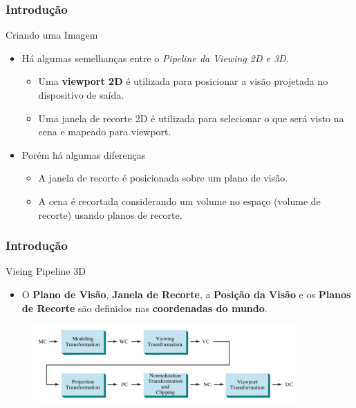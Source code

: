 \documentclass{beamer}
\begin{document}
\begin{frame}
\frametitle{Introdução}


	\begin{block}{Criando uma Imagem}
		\begin{itemize}
			\item<1-> Há algumas semelhanças entre o \textit{Pipeline da Viewing 2D e 3D}.
			\begin{itemize}
				\item Uma \textbf{viewport 2D} é utilizada para posicionar a visão projetada no dispositivo de saída.
				\item  Uma janela de recorte 2D é utilizada para selecionar o que será visto na cena e mapeado para viewport.
			\end{itemize}
			\item<2-> Porém há algumas diferenças
			\begin{itemize}
				\item A janela de recorte é posicionada sobre um plano de visão.
				\item A cena é recortada considerando um volume no espaço (volume de recorte) usando planos de recorte.
			\end{itemize}
		\end{itemize}
	\end{block}
\end{frame}

\begin{frame}
\frametitle{Introdução}


	\begin{block}{Vieing Pipeline 3D}
		\begin{itemize}
			\item O \textbf{Plano de Visão}, \textbf{Janela de Recorte}, a \textbf{Posição da Visão} e os \textbf{Planos de Recorte} são definidos nas \textbf{coordenadas do mundo}. 
		\end{itemize}
	\end{block}
	
	\begin{figure}[!h]
			\begin{center}
			\includegraphics[width=0.9\textwidth]{Figures/3DPip}
			\end{center}
	\end{figure}
\end{frame}
\end{document}
